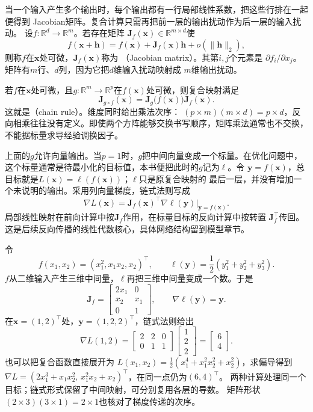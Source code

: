 当一个输入产生多个输出时，每个输出都有一行局部线性系数，把这些行排在一起便得到
Jacobian矩阵。复合计算只需再把前一层的输出扰动作为后一层的输入扰动。
设$f:\mathbb{R}^d\to\mathbb{R}^m$。若存在矩阵 $\bm{J}_f(\bm{x})\in\mathbb{R}^{m\times d}$使
\begin{equation}
  f(\bm{x}+\bm{h})
  =
  f(\bm{x})+\bm{J}_f(\bm{x})\bm{h}
  +o(\lVert\bm{h}\rVert_2),
\label{eq:analysis-jacobian-linearization}
\end{equation}
则称$f$在$\bm{x}$处可微，$\bm{J}_f(\bm{x})$称为
（Jacobian matrix）。其第$i,j$个元素是 $\partial f_i/\partial x_j$。矩阵有$m$行、$d$列，因为它把$d$维输入扰动映射成 $m$维输出扰动。

若$f$在$\bm{x}$处可微，且$g:\mathbb{R}^m\to\mathbb{R}^p$在$f(\bm{x})$处可微，则复合映射满足
\begin{equation}
  \bm{J}_{g\circ f}(\bm{x})
  =
  \bm{J}_g\bigl(f(\bm{x})\bigr)\bm{J}_f(\bm{x}).
\label{eq:analysis-vector-chain-rule}
\end{equation}
这就是（chain rule）。维度同时给出乘法次序： $(p\times m)(m\times d)=p\times d$，反向相乘往往没有定义。即使两个方阵能够交换书写顺序，矩阵乘法通常也不交换，不能据标量求导经验调换因子。

上面的$g$允许向量输出。当$p=1$时，$g$把中间向量变成一个标量。在优化问题中，
这个标量通常是待最小化的目标值，本书便把此时的$g$记为$\ell$。令
$\bm y=f(\bm x)$，总目标就是$L(\bm x)=\ell(f(\bm x))$；$\ell$只是原复合映射的
最后一层，并没有增加一个未说明的输出。采用列向量梯度，链式法则写成
\[
  \nabla L(\bm x)
  =\bm J_f(\bm x)^\top\nabla\ell(\bm y)\big|_{\bm y=f(\bm x)}.
\]
局部线性映射在前向计算中按$\bm J_f$作用，在标量目标的反向计算中按转置
$\bm J_f^\top$传回。这是后续反向传播的线性代数核心，具体网络结构留到模型章节。

\begin{example}[从中间向量求回复合目标的梯度]
\label{ex:analysis-chain-rule-calculation}
令
\[
  f(x_1,x_2)=(x_1^2,x_1x_2,x_2)^\top,
  \qquad \ell(\bm y)=\frac12(y_1^2+y_2^2+y_3^2).
\]
$f$从二维输入产生三维中间量，$\ell$再把三维中间量变成一个数。于是
\[
  \bm J_f=\begin{bmatrix}2x_1&0\\x_2&x_1\\0&1\end{bmatrix},
  \qquad \nabla\ell(\bm y)=\bm y.
\]
在$\bm x=(1,2)^\top$处，$\bm y=(1,2,2)^\top$，链式法则给出
\[
  \nabla L(1,2)
  =\begin{bmatrix}2&2&0\\0&1&1\end{bmatrix}
    \begin{bmatrix}1\\2\\2\end{bmatrix}
  =\begin{bmatrix}6\\4\end{bmatrix}.
\]
也可以把复合函数直接展开为
$L(x_1,x_2)=\tfrac12(x_1^4+x_1^2x_2^2+x_2^2)$，求偏导得到
$\nabla L=(2x_1^3+x_1x_2^2,\,x_1^2x_2+x_2)^\top$，在同一点仍为$(6,4)^\top$。
两种计算处理同一个目标；链式形式保留了中间映射，可分别复用各层的导数。
矩阵形状$(2\times3)(3\times1)=2\times1$也核对了梯度传递的次序。
\end{example}

